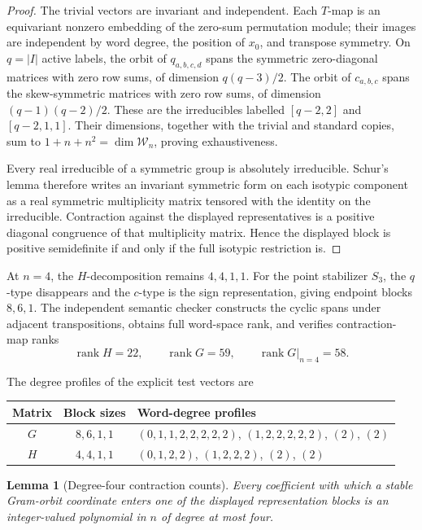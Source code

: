 \documentclass[11pt]{article}
\newtheorem{lemma}[theorem]{Lemma}
\newcommand{\W}{\mathcal W}
\begin{document}
\begin{proof}
The trivial vectors are invariant and independent.  Each \(T\)-map is an
equivariant nonzero embedding of the zero-sum permutation module; their
images are independent by word degree, the position of \(x_0\), and
transpose symmetry.  On \(q=|I|\) active labels, the orbit of
\(q_{a,b,c,d}\) spans the symmetric zero-diagonal matrices with zero row
sums, of dimension \(q(q-3)/2\).  The orbit of \(c_{a,b,c}\) spans the
skew-symmetric matrices with zero row sums, of dimension
\((q-1)(q-2)/2\).  These are the irreducibles labelled
\([q-2,2]\) and \([q-2,1,1]\).  Their dimensions, together with the trivial
and standard copies, sum to \(1+n+n^2=\dim\W_n\), proving exhaustiveness.

Every real irreducible of a symmetric group is absolutely irreducible.
Schur's lemma therefore writes an invariant symmetric form on each isotypic
component as a real symmetric multiplicity matrix tensored with the identity
on the irreducible.  Contraction against the displayed representatives is a
positive diagonal congruence of that multiplicity matrix.  Hence the
displayed block is positive semidefinite if and only if the full isotypic
restriction is.
\end{proof}

At \(n=4\), the \(H\)-decomposition remains \(4,4,1,1\).  For the
point stabilizer \(S_3\), the \(q\)-type disappears and the \(c\)-type is the
sign representation, giving endpoint blocks \(8,6,1\).  The independent
semantic checker constructs the cyclic spans under adjacent transpositions,
obtains full word-space rank, and verifies contraction-map ranks
\[
 \operatorname{rank}H=22,\qquad
 \operatorname{rank}G=59,\qquad
 \operatorname{rank}G|_{n=4}=58.
\]

The degree profiles of the explicit test vectors are
\begin{center}
\begin{tabular}{ccl}
\toprule
Matrix & Block sizes & Word-degree profiles\\
\midrule
\(G\) & \(8,6,1,1\) &
\((0,1,1,2,2,2,2,2)\), \((1,2,2,2,2,2)\), \((2)\), \((2)\)\\
\(H\) & \(4,4,1,1\) &
\((0,1,2,2)\), \((1,2,2,2)\), \((2)\), \((2)\)\\
\bottomrule
\end{tabular}
\end{center}

\begin{lemma}[Degree-four contraction counts]\label{lem:counting-degree}
Every coefficient with which a stable Gram-orbit coordinate enters one of the
displayed representation blocks is an integer-valued polynomial in \(n\) of
degree at most four.
\end{lemma}
\end{document}
